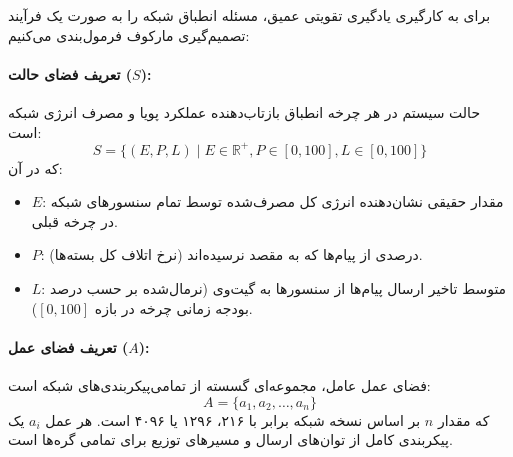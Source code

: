 \documentclass[oneside,openany,phd]{TMU-Thesis}
\begin{document}
برای به کارگیری یادگیری تقویتی عمیق، مسئله انطباق شبکه  را به صورت یک فرآیند تصمیم‌گیری مارکوف فرمول‌بندی می‌کنیم:

\paragraph{تعریف فضای حالت ($S$):}
حالت سیستم در هر چرخه انطباق بازتاب‌دهنده عملکرد پویا و مصرف انرژی شبکه است:
$$S = \{(E, P, L) \mid E \in \mathbb{R}^+, P \in [0, 100], L \in [0, 100]\}$$
که در آن:
\begin{itemize}
    \item $E$: مقدار حقیقی نشان‌دهنده انرژی کل مصرف‌شده توسط تمام سنسورهای شبکه در چرخه قبلی.
    \item $P$: درصدی از پیام‌ها که به مقصد نرسیده‌اند (نرخ اتلاف کل بسته‌ها).
    \item $L$: متوسط تاخیر ارسال پیام‌ها از سنسورها به گیت‌وی (نرمال‌شده بر حسب درصد بودجه زمانی چرخه در بازه $[0, 100]$).
\end{itemize}

\paragraph{تعریف فضای عمل ($A$):}
فضای عمل عامل، مجموعه‌ای گسسته از تمامی‌پیکربندی‌های شبکه است:
$$A = \{a_1, a_2, \ldots, a_n\}$$
که مقدار $n$ بر اساس نسخه شبکه برابر با ۲۱۶، ۱۲۹۶ یا ۴۰۹۶ است. هر عمل $a_i$ یک پیکربندی کامل از توان‌های ارسال و مسیرهای توزیع برای تمامی گره‌ها است.
\end{document}
